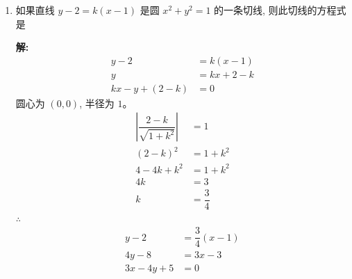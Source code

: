 \documentclass[10pt]{article}
\newcommand{\sol}{\textbf{解:} }
\begin{document}
\begin{enumerate}[leftmargin=*]
        \sol{}
        \begin{align*}
          (x+3)^{2}+(y-4)^{2}                 & = 25                                   \\
          x^{2} + 6x + 9 + y^{2} - 8y + 16    & = 25                                   \\
          x^{2} + y^{2} + 6x - 8y             & = 0                                    \\
          \text{切距}                           & = \sqrt{4^{2} + y^2 + 6 \times 4 - 8y} \\
                                              & = \sqrt{16 + y^2 + 24 - 8y}            \\
                                              & = \sqrt{40 + y^2 - 8y}                 \\
          \dfrac{d}{dy}(\sqrt{40 + y^2 - 8y}) & = 0                                    \\
          \dfrac{y - 4}{\sqrt{40 + y^2 - 8y}} & = 0                                    \\
          y                                   & = 4                                    \\
          \text{切距}                           & = \sqrt{40 + 4^2 - 8 \times 4}         \\
                                              & = \sqrt{40 + 16 - 32}                  \\
                                              & = \sqrt{24} = 2\sqrt{6}
        \end{align*}

  \item 如果直线 $y-2=k(x-1)$ 是圆 $x^{2}+y^{2}=1$ 的一条切线, 则此切线的方程式是

        \sol{}
        \begin{align*}
          y-2              & = k(x-1)     \\
          y                & = kx + 2 - k \\
          kx - y + (2 - k) & = 0
        \end{align*}
        圆心为 $(0, 0)$, 半径为 $1$。
        \begin{align*}
          \left\vert \dfrac{2-k}{\sqrt{1 + k^{2}}} \right\vert & = 1            \\
          (2-k)^{2}                                            & = 1 + k^{2}    \\
          4 - 4k + k^{2}                                       & = 1 + k^{2}    \\
          4k                                                   & = 3            \\
          k                                                    & = \dfrac{3}{4}
        \end{align*}
        $\therefore$
        \begin{align*}
          y - 2       & = \dfrac{3}{4}(x-1) \\
          4y - 8      & = 3x - 3            \\
          3x - 4y + 5 & = 0
        \end{align*}


\end{enumerate}
\end{document}
